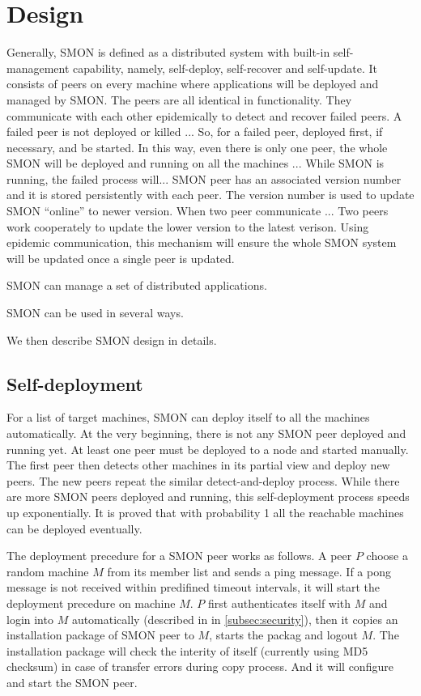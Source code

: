 \section{Design}

Generally, SMON is defined as a distributed system with
built-in self-management capability, namely, self-deploy,
self-recover and self-update. It consists of peers on every
machine where applications will be deployed and managed by
SMON. The peers are all identical in functionality. They
communicate with each other epidemically to detect and
recover failed peers. A failed peer is not deployed or
killed ... So, for a failed peer, deployed first, if
necessary, and be started. In this way, even there is only
one peer, the whole SMON will be deployed and running on all
the machines ... While SMON is running, the failed process
will... SMON peer has an associated version number and it is
stored persistently with each peer. The version number is
used to update SMON ``online'' to newer version. When two
peer communicate ...  Two peers work cooperately to update
the lower version to the latest verison. Using epidemic
communication, this mechanism will ensure the whole SMON
system will be updated once a single peer is updated.

SMON can manage a set of distributed applications.

SMON can be used in several ways.

We then describe SMON design in details.

\subsection{Self-deployment}

For a list of target machines, SMON can deploy itself to all
the machines automatically. At the very beginning, there is
not any SMON peer deployed and running yet. At least one
peer must be deployed to a node and started manually.  The
first peer then detects other machines in its partial view
and deploy new peers. The new peers repeat the similar
detect-and-deploy process. While there are more SMON peers
deployed and running, this self-deployment process speeds up
exponentially. It is proved that with probability 1 all the
reachable machines can be deployed
eventually\cite{Eugster2004}.

The deployment precedure for a SMON peer works as follows.
A peer $P$ choose a random machine $M$ from its member list
and sends a ping message. If a pong message is not received
within predifined timeout intervals, it will start the
deployment precedure on machine $M$. $P$ first authenticates
itself with $M$ and login into $M$ automatically (described
in in \ref{subsec:security}), then it copies an installation
package of SMON peer to $M$, starts the packag and logout
$M$. The installation package will check the interity of
itself (currently using MD5 checksum) in case of transfer
errors during copy process. And it will configure and start
the SMON peer.


